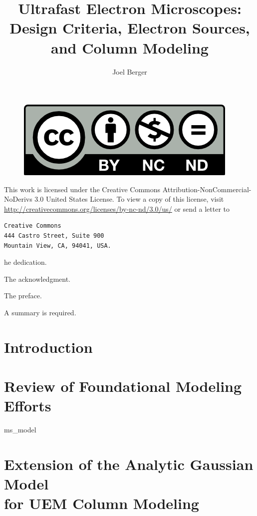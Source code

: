 \documentclass{uicthesi}
\title{Ultrafast Electron Microscopes: Design Criteria, Electron Sources, and Column Modeling}
\author{Joel Berger}
\begin{document}
\maketitle

\newpage
\begin{figure}
  \centering
  \includegraphics{by-nc-nd}
\end{figure}
This work is licensed under the Creative Commons Attribution-NonCommercial-NoDerivs 3.0 United States License.
To view a copy of this license, visit \url{http://creativecommons.org/licenses/by-nc-nd/3.0/us/} or send a letter to
\begin{verbatim}
Creative Commons
444 Castro Street, Suite 900
Mountain View, CA, 94041, USA.
\end{verbatim}


\dedication
The dedication.
 
\acknowledgment
The acknowledgment.
 
\preface
The preface.
 
\tableofcontents
\listoftables
\listoffigures
 

 
\summary
A summary is required.

\chapter{Introduction}

\chapter{Review of Foundational Modeling Efforts} \label{chap:previous_models}

  {ms_model}

\chapter{Extension of the Analytic Gaussian Model\\for UEM Column Modeling} \label{chap:extension}
\end{document}
